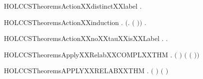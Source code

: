 \newcommand{\HOLCCSTheoremsActionXXdistinct}{\UseVerbatim{HOLCCSTheoremsActionXXdistinct}}
\begin{SaveVerbatim}{HOLCCSTheoremsActionXXdistinctXXlabel}
\HOLTokenTurnstile{} \HOLSymConst{\HOLTokenForall{}}.   \HOLSymConst{\HOLTokenNotEqual{}} \HOLConst{\ensuremath{\tau}}
\end{SaveVerbatim}
\newcommand{\HOLCCSTheoremsActionXXdistinctXXlabel}{\UseVerbatim{HOLCCSTheoremsActionXXdistinctXXlabel}}
\begin{SaveVerbatim}{HOLCCSTheoremsActionXXinduction}
\HOLTokenTurnstile{} \HOLSymConst{\HOLTokenForall{}}.  \HOLConst{\ensuremath{\tau}} \HOLSymConst{\HOLTokenConj{}} \ensuremath{(}\HOLSymConst{\HOLTokenForall{}}.  \ensuremath{(} \ensuremath{)}\ensuremath{)} \HOLSymConst{\HOLTokenImp{}} \HOLSymConst{\HOLTokenForall{}}.  
\end{SaveVerbatim}
\newcommand{\HOLCCSTheoremsActionXXinduction}{\UseVerbatim{HOLCCSTheoremsActionXXinduction}}
\begin{SaveVerbatim}{HOLCCSTheoremsActionXXnoXXtauXXisXXLabel}
\HOLTokenTurnstile{} \HOLSymConst{\HOLTokenForall{}}.  \HOLSymConst{\HOLTokenNotEqual{}} \HOLConst{\ensuremath{\tau}} \HOLSymConst{\HOLTokenImp{}} \HOLSymConst{\HOLTokenExists{}}.  \HOLSymConst{\ensuremath{=}}  
\end{SaveVerbatim}
\newcommand{\HOLCCSTheoremsActionXXnoXXtauXXisXXLabel}{\UseVerbatim{HOLCCSTheoremsActionXXnoXXtauXXisXXLabel}}
\begin{SaveVerbatim}{HOLCCSTheoremsApplyXXRelabXXCOMPLXXTHM}
\HOLTokenTurnstile{} \HOLSymConst{\HOLTokenForall{}} .
         \ensuremath{(} \ensuremath{)} \HOLSymConst{\ensuremath{=}}
        \ensuremath{(}  \ensuremath{(} \ensuremath{)}\ensuremath{)}
\end{SaveVerbatim}
\newcommand{\HOLCCSTheoremsApplyXXRelabXXCOMPLXXTHM}{\UseVerbatim{HOLCCSTheoremsApplyXXRelabXXCOMPLXXTHM}}
\begin{SaveVerbatim}{HOLCCSTheoremsAPPLYXXRELABXXTHM}
\HOLTokenTurnstile{} \HOLSymConst{\HOLTokenForall{}} .
       \ensuremath{(}  \HOLSymConst{\ensuremath{=}}  \ensuremath{)} \HOLSymConst{\HOLTokenEquiv{}}
       \ensuremath{(}  \HOLSymConst{\ensuremath{=}}  \ensuremath{)}
\end{SaveVerbatim}
